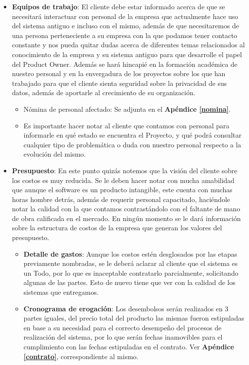 \begin{itemize}
	\item \textbf{Equipos de trabajo}: El cliente debe estar informado acerca de que se necesitará interactuar con personal de la empresa que actualmente hace uso del sistema antiguo e incluso con el mismo, además de que necesitaremos de una persona perteneciente a su empresa con la que podamos tener contacto constante y nos pueda quitar dudas acerca de diferentes temas relacionados al conocimiento de la empresa y su sistema antiguo para que desarrolle el papel del Product Owner.
Además se hará hincapié en la formación académica de nuestro personal y en la envergadura de los proyectos sobre los que han trabajado para que el cliente sienta seguridad sobre la privacidad de sus datos, además de aportarle al crecimiento de su organización.

	\begin{itemize}
		\item Nómina de personal afectado: Se adjunta en el \textbf{Apéndice \ref{nomina}}.
		\item Es importante hacer notar al cliente que contamos con personal para informarle en qué estado se encuentra el Proyecto, y qué podrá consultar cualquier tipo de problemática o duda con nuestro personal respecto a la evolución del mismo.

	\end{itemize} 
 
	\item \textbf{Presupuesto}:
    En este punto quizás notemos que la visión del cliente sobre los costos es muy reducida.
Se le deben hacer notar con mucha amabilidad que aunque el software es un producto intangible, este cuenta con muchas horas hombre detrás, además de requerir personal capacitado, haciéndole notar la calidad con la que contamos contrastándolo con el faltante de mano de obra calificada en el mercado. 
En ningún momento se le dará información sobre la estructura de costos de la empresa que generan los valores del presupuesto.

	\begin{itemize}
		\item \textbf{Detalle de gastos}:
        Aunque los costos estén desglosados por las etapas previamente nombradas, se le deberá aclarar al cliente que el sistema es un Todo, por lo que es inaceptable contratarlo parcialmente, solicitando algunas de las partes.
Esto de nuevo tiene que ver con la calidad de los sistemas que entregamos.

		\item \textbf{Cronograma de erogación}:
        Los desembolsos serán realizados en 3 partes iguales, del precio total del producto las mismas fueron estipuladas en base a su necesidad para el correcto desempeño del procesos de realización del sistema, por lo que serán fechas inamovibles para el cumplimiento con las fechas estipuladas en el contrato.
Ver \textbf{Apéndice \ref{contrato}}, correspondiente al mismo.
	\end{itemize}
    

\end{itemize}
